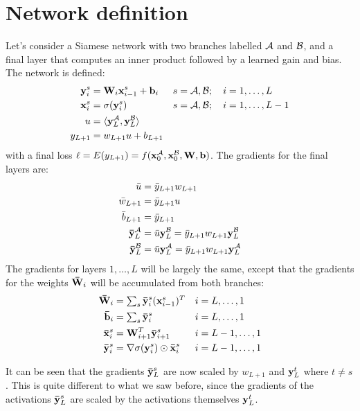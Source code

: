 \section{Network definition}

Let's consider a Siamese network with two branches labelled $\mathcal{A}$ and $\mathcal{B}$, and a final layer that computes an inner product followed by a learned gain and bias.
The network is defined:
\begin{align}
\boldsymbol{\mathbf{y}}_{i}^{s} & = \boldsymbol{\mathbf{W}}_{i} \boldsymbol{\mathbf{x}}_{i - 1}^{s} + \boldsymbol{\mathbf{b}}_{i} && s = \mathcal{A}, \mathcal{B}; \quad i = 1, \dots, L\\
\boldsymbol{\mathbf{x}}_{i}^{s} & = \sigma(\boldsymbol{\mathbf{y}}_{i}^{s}) && s = \mathcal{A}, \mathcal{B}; \quad i = 1, \dots, L - 1 \\
u & = \langle \boldsymbol{\mathbf{y}}_{L}^{\mathcal{A}}, \boldsymbol{\mathbf{y}}_{L}^{\mathcal{B}} \rangle \\
y_{L+1} & = w_{L+1} u + b_{L+1}
\end{align}
with a final loss $\ell = E(y_{L + 1}) = f(\boldsymbol{\mathbf{x}}_{0}^{\mathcal{A}}, \boldsymbol{\mathbf{x}}_{0}^{\mathcal{B}}, \mathbf{W}, \mathbf{b})$.
The gradients for the final layers are:
\begin{align}
\bar{u} & = \bar{y}_{L+1} w_{L+1} \\
\bar{w}_{L+1} & = \bar{y}_{L+1} u \\
\bar{b}_{L+1} & = \bar{y}_{L+1} \\
\boldsymbol{\mathbf{\bar{y}}}_{L}^{\mathcal{A}} & = \bar{u} \boldsymbol{\mathbf{y}}_{L}^{\mathcal{B}} = \bar{y}_{L+1} w_{L+1} \boldsymbol{\mathbf{y}}_{L}^{\mathcal{B}} \\
\boldsymbol{\mathbf{\bar{y}}}_{L}^{\mathcal{B}} & = \bar{u} \boldsymbol{\mathbf{y}}_{L}^{\mathcal{A}} = \bar{y}_{L+1} w_{L+1} \boldsymbol{\mathbf{y}}_{L}^{\mathcal{A}}
\end{align}
The gradients for layers $1, \dots, L$ will be largely the same, except that the gradients for the weights $\boldsymbol{\mathbf{\bar{W}}}_{i}$ will be accumulated from both branches:
\begin{align}
\boldsymbol{\mathbf{\bar{W}}}_{i} & = \textstyle \sum_{s} \boldsymbol{\mathbf{\bar{y}}}_{i}^{s} (\boldsymbol{\mathbf{x}}_{i - 1}^{s})^T && i = L, \dots, 1 \\
\boldsymbol{\mathbf{\bar{b}}}_{i} & = \textstyle \sum_{s} \boldsymbol{\mathbf{\bar{y}}}_{i}^{s} && i = L, \dots, 1 \\
\boldsymbol{\mathbf{\bar{x}}}_{i}^{s} & = \boldsymbol{\mathbf{W}}_{i + 1}^T \boldsymbol{\mathbf{\bar{y}}}_{i + 1}^{s} && i = L-1, \dots, 1 \\
\boldsymbol{\mathbf{\bar{y}}}_{i}^{s} & = \nabla\sigma(\boldsymbol{\mathbf{y}}_{i}^{s}) \odot \boldsymbol{\mathbf{\bar{x}}}_{i}^{s} && i = L - 1, \dots, 1
\end{align}

It can be seen that the gradients $\boldsymbol{\mathbf{\bar{y}}}_{L}^{s}$ are now scaled by $w_{L+1}$ and $\boldsymbol{\mathbf{y}}_{L}^{t}$ where $t \ne s$.
This is quite different to what we saw before, since the gradients of the activations $\boldsymbol{\mathbf{\bar{y}}}_{L}^{s}$ are scaled by the activations themselves $\boldsymbol{\mathbf{y}}_{L}^{t}$.


